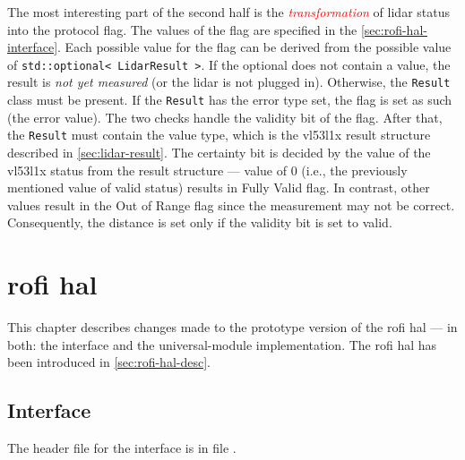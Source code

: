 \documentclass[
  digital,     %
  oneside,     %
  nosansbold,  %
  nocolorbold, %
  nolof,         %
  nolot,         %
]{fithesis4}
\newcommand{\TODO}[1]{\textcolor{red}{\textit{#1}}}
\newcommand{\TODOLIST}[1]{}
\begin{document}
{{{The most interesting part of the second half is the \TODO{transformation} of \acrshort{lidar} status into the protocol flag. The values of the flag are specified in the \autoref{sec:rofi-hal-interface}. Each possible value for the flag can be derived from the possible value of \lstinline|std::optional< LidarResult >|. If the optional does not contain a value,  the result is \emph{not yet measured} (or the \acrshort{lidar} is not plugged in). Otherwise, the \lstinline|Result| class must be present. If the \lstinline|Result| has the error type set, the flag is set as such (the error value). The two checks handle the validity bit of the flag. After that, the \lstinline|Result| must contain the value type, which is the \gls{vl53l1x} result structure described in \autoref{sec:lidar-result}. The certainty bit is decided by the value of the \gls{vl53l1x} status from the result structure --- value of $0$ (i.e., the previously mentioned value of valid status) results in Fully Valid flag. In contrast, other values result in the Out of Range flag since the measurement may not be correct. Consequently, the distance is set only if the validity bit is set to valid.


\chapter[ RoFI Hardware Abstraction Layer ]{ \acrshort{rofi} \acrlong{hal} } \label{ch:rofi-hal}

This chapter describes changes made to the prototype version of the \acrshort{rofi} \acrshort{hal} --- in both: the interface and the \gls{universal-module} implementation. The \acrshort{rofi} \acrshort{hal} has been introduced in \autoref{sec:rofi-hal-desc}.

\section{Interface} \label{sec:rofi-hal-interface}

\TODOLIST{
\begin{itemize}
    \item Current interface components - RoFI, joint, connector
    \item \textbf{Proxy} 
    \item Changes done --- Added distance and status
\end{itemize}
}

The header file for the interface is in file .

}}}
\end{document}
